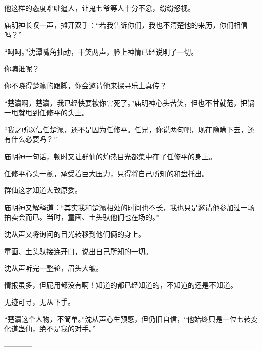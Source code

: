 \begin{this_body}
他这样的态度咄咄逼人，让鬼七爷等人十分不忿，纷纷怒视。

庙明神长叹一声，摊开双手：“若我告诉你们，我也不清楚他的来历，你们相信吗？”

“呵呵。”沈潭嘴角抽动，干笑两声，脸上神情已经说明了一切。

你骗谁呢？

你不晓得楚瀛的跟脚，你会邀请他来探寻乐土真传？

“楚瀛啊，楚瀛，我已经快要被你害死了。”庙明神心头苦笑，但也不甘就范，把锅一甩就甩到任修平的头上。

“我之所以信任楚瀛，还不是因为任修平。任兄，你说两句吧，现在隐瞒下去，还有什么必要吗？”

庙明神一句话，顿时又让群仙的灼热目光都集中在了任修平的身上。

任修平心头一颤，承受着巨大压力，只得将自己所知的和盘托出。

群仙这才知道大致原委。

庙明神又解释道：“其实我和楚瀛相处的时间也不长，我也只是邀请他参加过一场拍卖会而已。当时，童画、土头驮他们也在场的。”

沈从声又将询问的目光转移到他们俩的身上。

童画、土头驮接连开口，说出自己所知的一切。

沈从声听完一整轮，眉头大皱。

情报虽多，但屁用都没有啊！知道的都已经知道的，不知道的还是不知道。

无迹可寻，无从下手。

“楚瀛这个人物，不简单。”沈从声心生预感，但仍旧自信，“他始终只是一位七转变化道蛊仙，绝不是我的对手。”

------------

\end{this_body}

